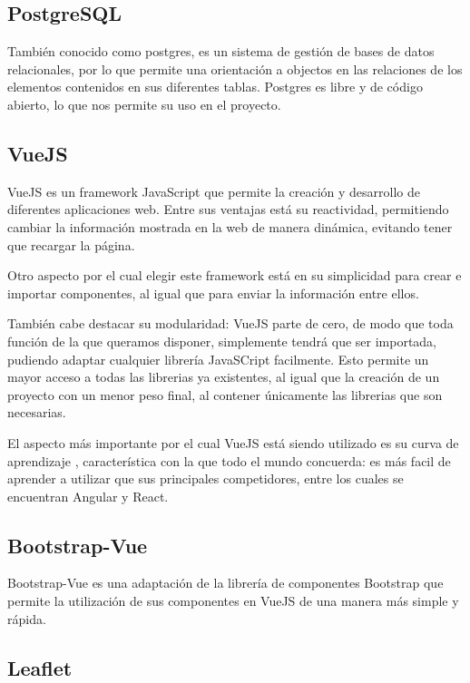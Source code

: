     \subsection{PostgreSQL}
También conocido como postgres, es un sistema de gestión de bases de datos relacionales, por lo que permite una orientación a objectos en las relaciones de los elementos contenidos en sus diferentes tablas.
Postgres es libre y de código abierto, lo que nos permite su uso en el proyecto.

    \subsection{VueJS}

VueJS es un framework JavaScript que permite la creación y desarrollo de diferentes aplicaciones web.
Entre sus ventajas está su reactividad, permitiendo cambiar la información mostrada en la web de manera dinámica, evitando tener que recargar la página. 

Otro aspecto por el cual elegir este framework está en su simplicidad para crear e importar componentes, al igual que para enviar la información entre ellos.

También cabe destacar su modularidad: VueJS parte de cero, de modo que toda función de la que queramos disponer, simplemente tendrá que ser importada, pudiendo adaptar cualquier librería JavaSCript facilmente. Esto permite un mayor acceso a todas las librerias ya existentes, al igual que la creación de un proyecto con un menor peso final, al contener únicamente las librerias que son necesarias.

El aspecto más importante por el cual VueJS está siendo utilizado es su curva de aprendizaje , característica con la que todo el mundo concuerda: es más facil de aprender a utilizar que sus principales competidores, entre los cuales se encuentran Angular y React.

    \subsection{Bootstrap-Vue}

Bootstrap-Vue es una adaptación de la librería de componentes Bootstrap que permite la utilización de sus componentes en VueJS de una manera más simple y rápida.

    \subsection{Leaflet}

